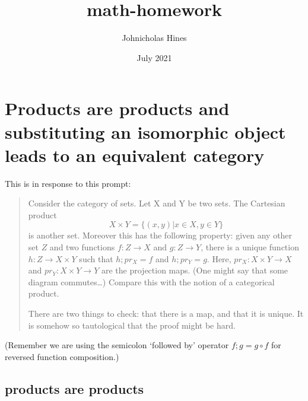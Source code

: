 \documentclass{proc-l}
\title{math-homework}
\author{Johnicholas Hines}
\date{July 2021}
\theoremstyle{definition}
\theoremstyle{remark}
\numberwithin{equation}{section}
\begin{document}
\maketitle

\section{Products are products and substituting an isomorphic object leads to an equivalent category}




This is in response to this prompt:

\begin{quote}
Consider the category of sets. Let X and Y be two sets. The Cartesian product
\[
X \times Y = \{(x,y) | x \in X, y \in Y\}
\]
is another set. Moreover this has the following property: given any other set \(Z\) and two functions \(f: Z \to X\) and \(g: Z \to Y\), there is a unique function \(h: Z \to X \times Y\) such that \(h; pr_X = f\) and \(h ; pr_Y = g\). Here, \(pr_X: X \times Y \to X\) and \(pr_Y: X \times Y \to Y\) are the projection maps. (One might say that some diagram commutes…) Compare this with the notion of a categorical product. 

There are two things to check: that there is a map, and that it is unique. It is somehow so tautological that the proof might be hard.
\end{quote}

(Remember we are using the semicolon `followed by' operator \(f; g = g \circ f\) for reversed function composition.)

\subsection{products are products}
\end{document}
